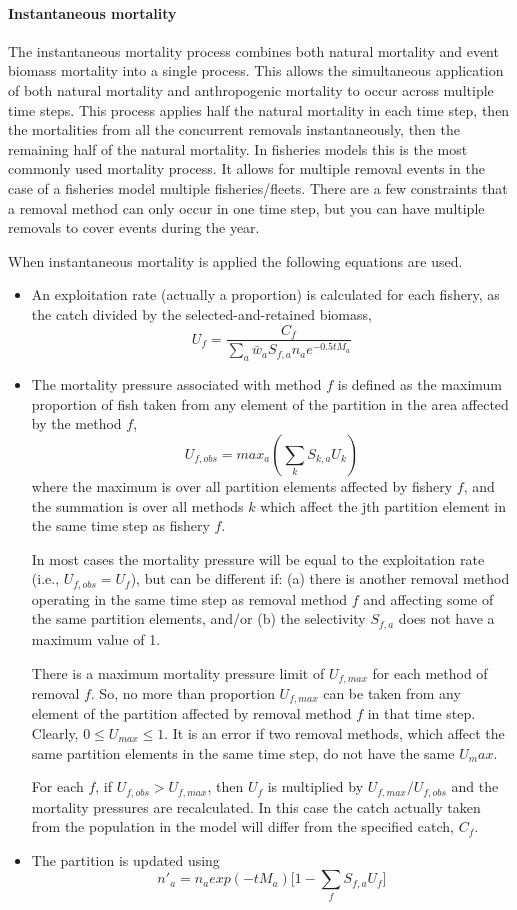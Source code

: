 \paragraph{Instantaneous mortality}\label{subsubsec:instantaneous-mortality}

The instantaneous mortality process combines both natural mortality and event biomass mortality into a single process. This allows the simultaneous application of both natural mortality and anthropogenic mortality to occur across multiple time steps. This process applies half the natural mortality in each time step, then the mortalities from all the concurrent removals instantaneously, then the remaining half of the natural mortality. In fisheries models this is the most commonly used mortality process. It allows for multiple removal events in the case of a fisheries model multiple fisheries/fleets. There are a few constraints that a removal method can only occur in one time step, but you can have multiple removals to cover events during the year.

When instantaneous mortality is applied the following equations are used.

\begin{itemize}
	\item An exploitation rate (actually a proportion) is calculated for each fishery, as the catch divided by the selected-and-retained biomass,
	$$ U_f = \frac{C_f}{\sum_a \bar{w}_aS_{f,a}n_a e^{-0.5tM_a}}$$
	\item The mortality pressure associated with method $f$ is defined as the maximum proportion of fish taken from any element of the partition in the area affected by the method $f$,
	$$ U_{f,obs} = max_a(\sum_k S_{k,a}U_k) $$
	where the maximum is over all partition elements affected by fishery $f$, and the summation is over all methods $k$ which affect the jth partition element in the same time step as fishery $f$.

In most cases the mortality pressure will be equal to the exploitation rate (i.e., $U_{f,obs} = U_f$), but can be different if: (a) there is another removal method operating in the same time step as removal method $f$ and affecting some of the same partition elements, and/or (b) the selectivity $S_{f,a}$ does not have a maximum value of 1.

There is a maximum mortality pressure limit of $U_{f,max}$ for each method of removal $f$. So, no more than proportion $U_{f,max}$ can be taken from any element of the partition affected by removal method $f$ in that time step. Clearly, $0 \leq U_{max} \leq 1$. It is an error if two removal methods, which affect the same partition elements in the same time step, do not have the same $U_max$.

For each $f$, if $U_{f,obs} > U_{f,max}$, then $U_f$ is multiplied by $U_{f,max}/U_{f,obs}$ and the mortality pressures are recalculated. In this case the catch actually taken from the population in the model will differ from the specified catch, $C_f$.

\item The partition is updated using
	$$ n'_a = n_a exp(-tM_a)\big[1 - \sum_f S_{f,a} U_f \big] $$
\end{itemize}

